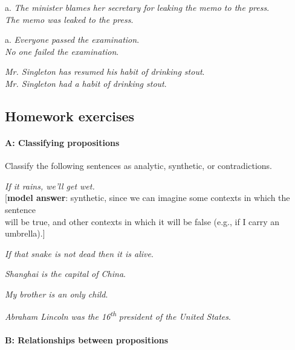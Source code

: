 \begin{stylepoints}
\ea%
    \label{ex:key:3}

          a. \textit{The minister blames her secretary for leaking the memo to the press}.\\
\ex \textit{The memo was leaked to the press}.
\z
\end{stylepoints}

\begin{stylepoints}
\ea%
    \label{ex:key:4}
  
          a. \textit{Everyone passed the examination}.\\
\ex \textit{No one failed the examination}.
\z
\end{stylepoints}

\begin{stylepoints}
\ea%
    \label{ex:key:5}
\textit{Mr. Singleton has resumed his habit of drinking stout}.\\
\ex \textit{Mr. Singleton had a habit of drinking stout}.
    \z
\end{stylepoints}

\subsection*{Homework exercises}
\paragraph*{A: Classifying propositions}

Classify the following sentences as analytic, synthetic, or contradictions.

\ea
\ea \textit{If it rains, we’ll get wet.}\\
  {}[\textbf{model answer}: synthetic, since we can imagine some contexts in which the sentence\\
  will be true, and other contexts in which it will be false (e.g., if I carry an umbrella).]

\ex \textit{If that snake is not dead then it is alive}.

\ex \textit{Shanghai is the capital of China}.

\ex \textit{My brother is an only child}.

\ex \textit{Abraham Lincoln was the 16\textsuperscript{th}} \textit{president of the United States}.
                       \z
\z
\paragraph*{B: Relationships between propositions}

